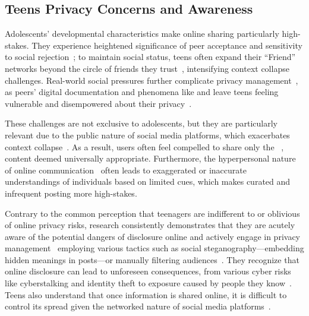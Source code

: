 \subsection{Teens Privacy Concerns and Awareness}
Adolescents' developmental characteristics make online sharing particularly high-stakes. They experience heightened significance of peer acceptance and sensitivity to social rejection~\cite{Somerville2013-zf}; to maintain social status, teens often expand their ``Friend'' networks beyond the circle of friends they trust~\cite{Yau2019-ab}, intensifying context collapse challenges. Real-world social pressures further complicate privacy management~\cite{Weinstein2022-rh}, as peers' digital documentation and phenomena like   and   leave teens feeling vulnerable and disempowered about their privacy~\cite{Weinstein2022-rh, BoydDanah2014ICTS}. 

These challenges are not exclusive to adolescents, but they are particularly relevant due to the public nature of social media platforms, which exacerbates context collapse~\cite{BoydDanah2014ICTS}. As a result, users often feel compelled to share only the ~\cite{Hogan2010-oh}, content deemed universally appropriate. Furthermore, the hyperpersonal nature of online communication~\cite{walther2011introduction} often leads to exaggerated or inaccurate understandings of individuals based on limited cues, which makes curated and infrequent posting more high-stakes.

Contrary to the common perception that teenagers are indifferent to or oblivious of online privacy risks, research consistently demonstrates that they are acutely aware of the potential dangers of disclosure online and actively engage in privacy management~\cite{Cho-2018-CollectivePrivacyValidation-h} employing various tactics such as social steganography---embedding hidden meanings in posts---or manually filtering audiences~\cite{DeWolf-2014-ManagingPrivacyFacebook-c}. They recognize that online disclosure can lead to unforeseen consequences, from various cyber risks like cyberstalking and identity theft to exposure caused by people they know~\cite{Agha2023-mu, zhao2022understanding}. Teens also understand that once information is shared online, it is difficult to control its spread given the networked nature of social media platforms~\cite{Dienlin-2015-PrivacyParadoxBehaviors-w, DeWolf-2014-ManagingPrivacyFacebook-c}.

